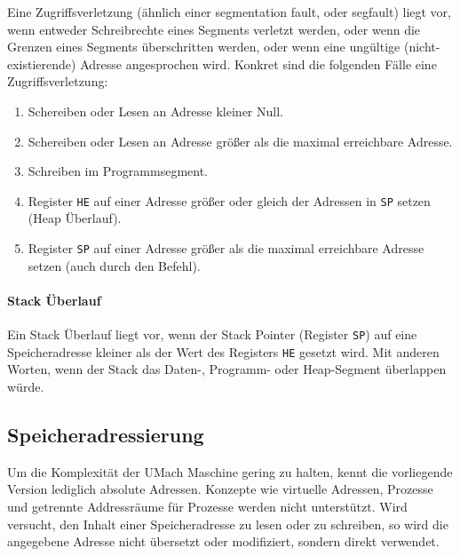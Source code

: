 Eine Zugriffsverletzung (ähnlich einer \glqq segmentation fault\grqq, oder
\glqq segfault\grqq)  liegt vor, wenn entweder Schreibrechte
eines Segments verletzt werden, oder wenn die Grenzen eines Segments
überschritten werden, oder wenn eine ungültige (nicht-existierende) Adresse
angesprochen wird. Konkret sind die folgenden Fälle eine Zugriffsverletzung:
\begin{enumerate}
 \item Schereiben oder Lesen an Adresse kleiner Null.
 \item Schereiben oder Lesen an Adresse größer als die maximal erreichbare
       Adresse.
 \item Schreiben im Programmsegment.
 \item Register \texttt{HE} auf einer Adresse größer oder gleich der Adressen in
       \texttt{SP} setzen (Heap Überlauf).
 \item Register \texttt{SP} auf einer Adresse größer als die maximal erreichbare
       Adresse setzen (auch durch den  Befehl).
\end{enumerate}



\paragraph{Stack Überlauf}
Ein Stack Überlauf liegt vor, wenn der Stack Pointer (Register \texttt{SP})
 auf eine Speicheradresse kleiner als der Wert des
Registers \texttt{HE} gesetzt wird. Mit anderen Worten, wenn der Stack das
Daten-, Programm- oder Heap-Segment überlappen würde.


\subsection{Speicheradressierung}

Um die Komplexität der UMach Maschine gering zu halten, kennt die vorliegende
Version lediglich absolute Adressen. Konzepte wie virtuelle Adressen,
Prozesse und getrennte Addressräume für Prozesse werden nicht
unterstützt. Wird versucht, den Inhalt einer Speicheradresse zu lesen oder zu
schreiben, so wird die angegebene Adresse nicht übersetzt oder modifiziert,
sondern direkt verwendet.

